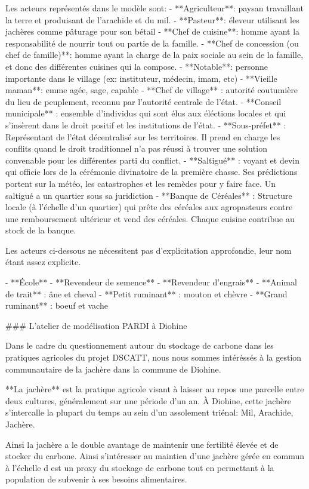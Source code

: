 Les acteurs représentés dans le modèle sont:
- **Agriculteur**: paysan travaillant la terre et produisant de l'arachide et du mil.
- **Pasteur**: éleveur utilisant les jachères comme pâturage pour son bétail
- **Chef de cuisine**: homme ayant la responsabilité de nourrir tout ou partie de la famille.
- **Chef de concession (ou chef de famille)**: homme ayant la charge de la paix sociale au sein de la famille, et donc des différentes cuisines qui la compose.
- **Notable**: personne importante dans le village (ex: instituteur, médecin, imam, etc)
- **Vieille maman**:  emme agée, sage, capable 
- **Chef de village** : autorité coutumière du lieu de peuplement, reconnu par l'autorité centrale de l'état. 
- **Conseil municipale** : ensemble d'individus qui sont élus aux éléctions locales et qui s'insèrent dans le droit positif et les institutions de l'état.
- **Sous-préfet** : Représentant de l'état décentralisé sur les territoires. Il prend en charge les conflits quand le droit traditionnel n'a pas réussi à trouver une solution convenable pour les différentes parti du conflict.
- **Saltigué** : voyant et devin qui officie lors de la cérémonie divinatoire de la première chasse. Ses prédictions portent sur la météo, les catastrophes et les remèdes pour y faire face. Un saltigué a un quartier sous sa juridiction
- **Banque de Céréales** : Structure locale (à l'échelle d'un quartier) qui prête des céréales aux agropasteurs contre une remboursement ultérieur et vend des céréales. Chaque cuisine contribue au stock de la banque.


Les acteurs ci-dessous ne nécessitent pas d'explicitation approfondie, leur nom étant assez explicite.

- **École**
- **Revendeur de semence**
- **Revendeur d'engrais**
- **Animal de trait** : âne et cheval
- **Petit ruminant** : mouton et chèvre
- **Grand ruminant** : boeuf et vache

### L'atelier de modélisation PARDI à Diohine 

Dans le cadre du questionnement autour du stockage de carbone dans les pratiques agricoles du projet DSCATT, nous nous sommes intéréssés à la gestion communautaire de la jachère dans la commune de Diohine. 

**La jachère** est la pratique agricole visant à laisser au repos une parcelle entre deux cultures, généralement sur une période d'un an. À Diohine, cette jachère s'intercalle la plupart du temps au sein d'un assolement triénal: Mil, Arachide, Jachère.

Ainsi la jachère a le double avantage de maintenir une fertilité élevée et de stocker du carbone. Ainsi s'intéresser au maintien d'une jachère gérée en commun à l'échelle d est un proxy du stockage de carbone tout en permettant à la population de subvenir à ses besoins alimentaires.

